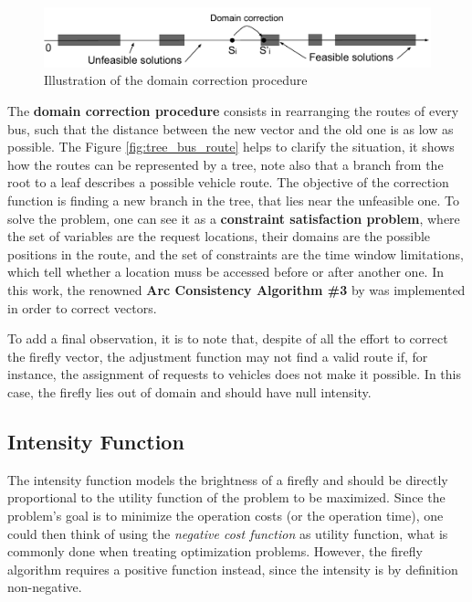\documentclass[tuberlin,cic,tc,openright,english,noabntcite,oneside]{iiufrgs}
\begin{document}
\begin{figure}[H]
	\centering
    \caption{Illustration of the domain correction procedure}
    \includegraphics[width=\textwidth]{fig_solution_domain}\par
    \label{fig:solution_domain}
\end{figure}

The \textbf{domain correction procedure} consists in rearranging the routes of every bus, such that the distance between the new vector and the old one is as low as possible. The Figure \ref{fig:tree_bus_route} helps to clarify the situation, it shows how the routes can be represented by a tree, note also that a branch from the root to a leaf describes a possible vehicle route. The objective of the correction function is finding a new branch in the tree, that lies near the unfeasible one. To solve the problem, one can see it as a \textbf{constraint satisfaction problem}, where the set of variables are the request locations, their domains are the possible positions in the route, and the set of constraints are the time window limitations, which tell whether a location muss be accessed before or after another one. In this work, the renowned \textbf{Arc Consistency Algorithm \#3} by \textcite{mackworth_consistency_1977} was implemented in order to correct vectors.

To add a final observation, it is to note that, despite of all the effort to correct the firefly vector, the adjustment function may not find a valid route if, for instance, the assignment of requests to vehicles does not make it possible. In this case, the firefly lies out of domain and should have null intensity.

\subsection{Intensity Function}
The intensity function models the brightness of a firefly and should be directly proportional to the utility function of the problem to be maximized. Since the problem's goal is to minimize the operation costs (or the operation time), one could then think of using the \emph{negative cost function} as utility function, what is commonly done when treating optimization problems. However, the firefly algorithm requires a positive function instead, since the intensity is by definition non-negative.
\end{document}
